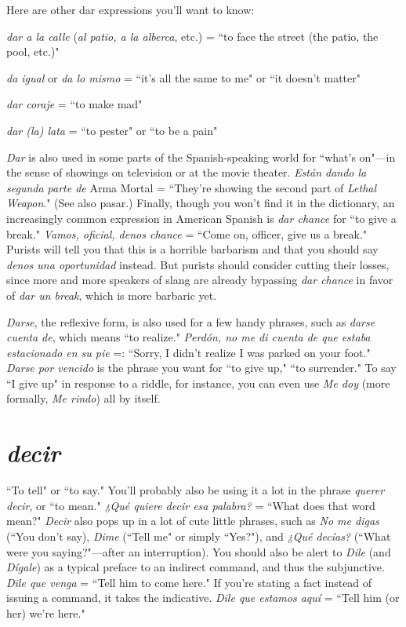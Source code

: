 Here are other dar expressions you'll want to know:

\bsk

\indu \emph{dar a la calle} (\emph{al patio, a la alberca}, etc.) = ``to face the street
(the patio, the pool, etc.)"

\indu \emph{da igual} or \emph{da lo mismo} = ``it's all the same to me" or ``it
doesn't matter"

\indu \emph{dar coraje} = ``to make mad"

\indu \emph{dar (la) lata} = ``to pester" or ``to be a pain"

\bsk

\emph{Dar} is also used in some parts of the Spanish-speaking world for
``what's on"---in the sense of showings on television or at the movie
theater. \emph{Están dando la segunda parte de} Arma Mortal = ``They're
showing the second part of \emph{Lethal Weapon}." (See also pasar.) Finally,
though you won't find it in the dictionary, an increasingly common expression in American Spanish is \emph{dar chance} for ``to give a break." \emph{Vamos, oficial, denos chance} = ``Come on, officer, give us a break." Purists will tell you that this is a horrible barbarism and that you should
say \emph{denos una oportunidad} instead. But purists should consider cutting their losses, since more and more speakers of slang are already bypassing \emph{dar chance} in favor of \emph{dar un break}, which is more barbaric yet.

\emph{Darse}, the reflexive form, is also used for a few handy phrases,
such as \emph{darse cuenta de}, which means ``to realize." \emph{Perdón, no me di
	cuenta de que estaba estacionado en su pie} =: ``Sorry, I didn't realize
I was parked on your foot." \emph{Darse por vencido} is the phrase you want
for ``to give up," ``to surrender." To say ``I give up" in response to a
riddle, for instance, you can even use \emph{Me doy} (more formally, \emph{Me rindo}) all by itself.

\section{\emph{decir}}

``To tell" or ``to say." You'll probably also be using it a lot in
the phrase \emph{querer decir}, or ``to mean." \emph{¿Qué quiere decir esa palabra?}
= ``What does that word mean?" \emph{Decir} also pops up in a lot of cute
little phrases, such as \emph{No me digas} (``You don't say), \emph{Dime} (``Tell me"
or simply ``Yes?"), and \emph{¿Qué decías?} (``What were you saying?"---after
an interruption). You should also be alert to \emph{Dile} (and \emph{Dígale}) as a typical preface to an indirect command, and thus the subjunctive. \emph{Dile que
	venga} = ``Tell him to come here." If you're stating a fact instead of
issuing a command, it takes the indicative. \emph{Dile que estamos aquí} =
``Tell him (or her) we're here."

